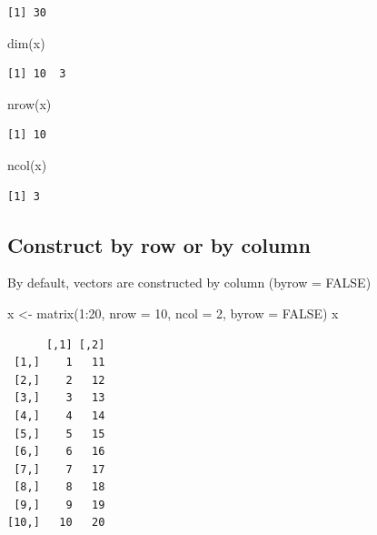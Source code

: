 \documentclass[
]{book}
\newenvironment{Shaded}{\begin{snugshade}}{\end{snugshade}}
\newcommand{\AttributeTok}[1]{\textcolor[rgb]{0.77,0.63,0.00}{#1}}
\newcommand{\ConstantTok}[1]{\textcolor[rgb]{0.00,0.00,0.00}{#1}}
\newcommand{\DecValTok}[1]{\textcolor[rgb]{0.00,0.00,0.81}{#1}}
\newcommand{\FunctionTok}[1]{\textcolor[rgb]{0.00,0.00,0.00}{#1}}
\newcommand{\NormalTok}[1]{#1}
\newcommand{\OtherTok}[1]{\textcolor[rgb]{0.56,0.35,0.01}{#1}}
\newcommand{\SpecialCharTok}[1]{\textcolor[rgb]{0.00,0.00,0.00}{#1}}
\begin{document}
\begin{verbatim}
[1] 30
\end{verbatim}

\begin{Shaded}
\begin{Highlighting}[]
\FunctionTok{dim}\NormalTok{(x)}
\end{Highlighting}
\end{Shaded}

\begin{verbatim}
[1] 10  3
\end{verbatim}

\begin{Shaded}
\begin{Highlighting}[]
\FunctionTok{nrow}\NormalTok{(x)}
\end{Highlighting}
\end{Shaded}

\begin{verbatim}
[1] 10
\end{verbatim}

\begin{Shaded}
\begin{Highlighting}[]
\FunctionTok{ncol}\NormalTok{(x)}
\end{Highlighting}
\end{Shaded}

\begin{verbatim}
[1] 3
\end{verbatim}

\hypertarget{construct-by-row-or-by-column}{%
\subsection{Construct by row or by column}\label{construct-by-row-or-by-column}}

By default, vectors are constructed by column (byrow = FALSE)

\begin{Shaded}
\begin{Highlighting}[]
\NormalTok{x }\OtherTok{\textless{}{-}} \FunctionTok{matrix}\NormalTok{(}\DecValTok{1}\SpecialCharTok{:}\DecValTok{20}\NormalTok{, }\AttributeTok{nrow =} \DecValTok{10}\NormalTok{, }\AttributeTok{ncol =} \DecValTok{2}\NormalTok{, }\AttributeTok{byrow =} \ConstantTok{FALSE}\NormalTok{)}
\NormalTok{x}
\end{Highlighting}
\end{Shaded}

\begin{verbatim}
      [,1] [,2]
 [1,]    1   11
 [2,]    2   12
 [3,]    3   13
 [4,]    4   14
 [5,]    5   15
 [6,]    6   16
 [7,]    7   17
 [8,]    8   18
 [9,]    9   19
[10,]   10   20
\end{verbatim}
\end{document}
